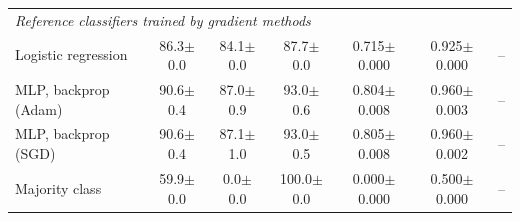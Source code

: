 \begin{table}[!t]
\begin{tabular}{lcccccc}
\multicolumn{7}{l}{\textit{Reference classifiers trained by gradient methods}} \\
Logistic regression & 86.3$\pm$0.0 & 84.1$\pm$0.0 & 87.7$\pm$0.0 & 0.715$\pm$0.000 & 0.925$\pm$0.000 & -- \\
MLP, backprop (Adam) & 90.6$\pm$0.4 & 87.0$\pm$0.9 & 93.0$\pm$0.6 & 0.804$\pm$0.008 & 0.960$\pm$0.003 & -- \\
MLP, backprop (SGD) & 90.6$\pm$0.4 & 87.1$\pm$1.0 & 93.0$\pm$0.5 & 0.805$\pm$0.008 & 0.960$\pm$0.002 & -- \\
Majority class & 59.9$\pm$0.0 & 0.0$\pm$0.0 & 100.0$\pm$0.0 & 0.000$\pm$0.000 & 0.500$\pm$0.000 & -- \\
\bottomrule
\end{tabular}
\end{table}
